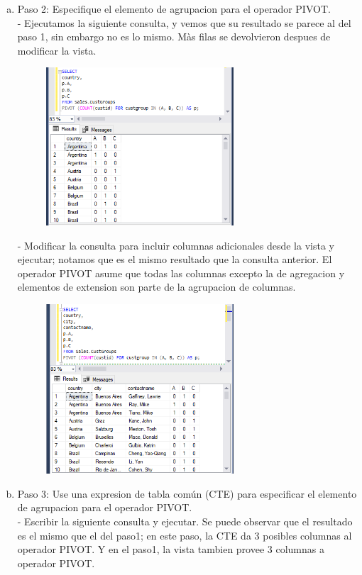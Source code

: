 \begin{enumerate}[1.]
\begin{enumerate}[a)]
	\item Paso 2: Especifique el elemento de agrupacion para el operador PIVOT. \\
		-  Ejecutamos la siguiente consulta, y vemos que su resultado se parece al del paso 1, sin embargo no es lo mismo. Màs filas se devolvieron despues de modificar la vista.
		\begin{figure}[H]
		\begin{center}
		\includegraphics[width=7cm]{./Imagenes/e1-2-1}
		\end{center}
		\end{figure}
		-  Modificar la consulta para incluir columnas adicionales desde la vista y ejecutar; notamos que es el mismo resultado que la consulta anterior. El operador PIVOT asume que todas las columnas excepto la de agregacion y elementos de extension son parte de la agrupacion de columnas.
		\begin{figure}[H]
		\begin{center}
		\includegraphics[width=7cm]{./Imagenes/e1-2-2}
		\end{center}
		\end{figure}
	\item Paso 3: Use una expresion de tabla común (CTE) para especificar el elemento de agrupacion para el operador PIVOT.\\
		-  Escribir la siguiente consulta y ejecutar. Se puede observar que el resultado es el mismo que el del paso1; en este paso, la CTE da 3 posibles columnas al operador PIVOT. Y en el paso1, la vista tambien provee 3 columnas a operador PIVOT.

\end{enumerate}
\end{enumerate}
